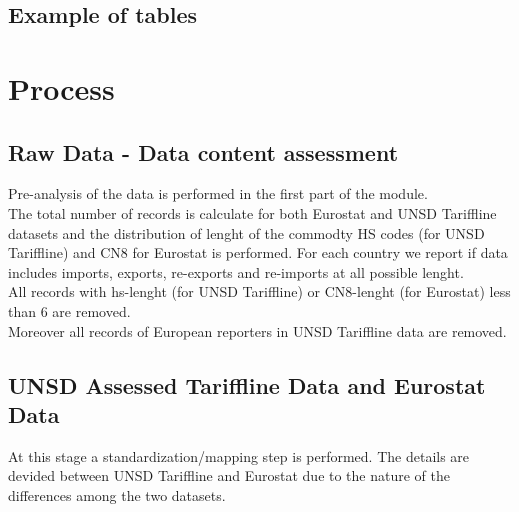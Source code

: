 \documentclass[nojss]{jss}\usepackage[]{graphicx}\usepackage[]{color}
\begin{document}
\subsection{Example of tables}





\section{Process}
\subsection{Raw Data - Data content assessment}
Pre-analysis of the data is performed in the first part of the module.\\
The total number of records is calculate for both Eurostat and UNSD Tariffline datasets and the distribution of lenght of the commodty HS codes (for UNSD Tariffline) and CN8 for Eurostat is performed. For each country we report if data includes imports, exports, re-exports and re-imports at all possible lenght.\\
All records with hs-lenght (for UNSD Tariffline) or CN8-lenght (for Eurostat) less than 6 are removed.\\
Moreover all records of European reporters in UNSD Tariffline data are removed.

\subsection{UNSD Assessed Tariffline Data and Eurostat Data}
At this stage a standardization/mapping step is performed. The details are devided between UNSD Tariffline and Eurostat due to the nature of the differences among the two datasets.
\end{document}
